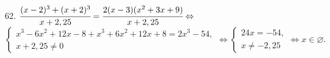 62. $\cfrac{(x-2)^3+(x+2)^3}{x+2,25}=\cfrac{2(x-3)(x^2+3x+9)}{x+2,25}\Leftrightarrow$\\$
\begin{cases} x^3-6x^2+12x-8+x^3+6x^2+12x+8=2x^3-54,\\ x+2,25\neq0\end{cases}\Leftrightarrow
\begin{cases} 24x=-54,\\ x\neq-2,25\end{cases}\Leftrightarrow x\in \varnothing.$\\
